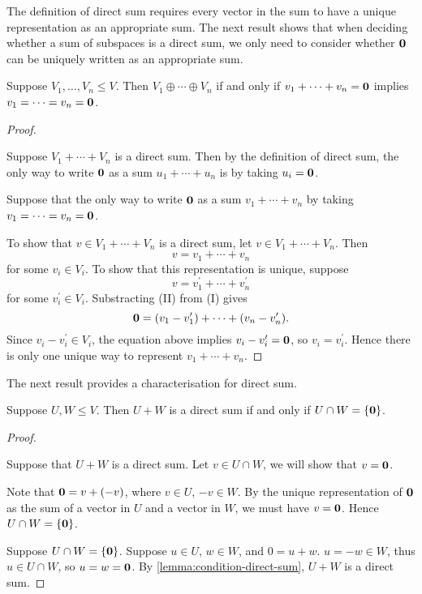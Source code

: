 The definition of direct sum requires
every vector in the sum to have a unique representation as an appropriate sum.
The next result shows that when deciding whether a sum of subspaces is a direct sum, we only need to consider whether $\vb{0}$ can be uniquely written as an appropriate sum.

\begin{lemma}\label{lemma:condition-direct-sum}
Suppose $V_1,\dots,V_n\le V$. Then $V_1\oplus\cdots\oplus V_n$ if and only if $v_1+\cdots+v_n=\vb{0}$ implies $v_1=\cdots=v_n=\vb{0}$.
\end{lemma}

\begin{proof} \

 Suppose $V_1+\cdots+V_n$ is a direct sum. Then by the definition of direct sum, the only way to write $\vb{0}$ as a sum $u_1+\cdots+u_n$ is by taking $u_i=\vb{0}$.

 Suppose that the only way to write $\vb{0}$ as a sum $v_1+\cdots+v_n$ by taking $v_1=\cdots=v_n=\vb{0}$. 

To show that $v\in V_1+\cdots+V_n$ is a direct sum, let $v\in V_1+\cdots+V_n$. Then
\begin{equation*}\tag{I}
v=v_1+\cdots+v_n
\end{equation*}
for some $v_i\in V_i$.
To show that this representation is unique, suppose
\begin{equation*}\tag{II}
v=v_1^\prime+\cdots+v_n^\prime
\end{equation*}
for some $v_i^\prime\in V_i$.
Substracting (II) from (I) gives
\[\vb{0}=(v_1-v_1^\prime)+\cdots+(v_n-v_n^\prime).\]
Since $v_i-v_i^\prime\in V_i$, the equation above implies $v_i-v_i^\prime=\vb{0}$, so $v_i=v_i^\prime$. Hence there is only one unique way to represent $v_1+\cdots+v_n$.
\end{proof}

The next result provides a characterisation for direct sum.

\begin{lemma}\label{lemma:direct-sum-intersection-zero}
Suppose $U,W\le V$. Then $U+W$ is a direct sum if and only if $U\cap W=\{\vb{0}\}$.
\end{lemma}

\begin{proof} \

\fbox{$\implies$} Suppose that $U+W$ is a direct sum. Let $v\in U\cap W$, we will show that $v=\vb{0}$.

Note that $\vb{0}=v+(-v)$, where $v\in U$, $-v\in W$. By the unique representation of $\vb{0}$ as the sum of a vector in $U$ and a vector in $W$, we must have $v=\vb{0}$. Hence $U\cap W=\{\vb{0}\}$.

\fbox{$\impliedby$} Suppose $U\cap W=\{\vb{0}\}$. Suppose $u\in U$, $w\in W$, and $0=u+w$. $u=-w\in W$, thus $u\in U\cap W$, so $u=w=\vb{0}$. By \ref{lemma:condition-direct-sum}, $U+W$ is a direct sum.
\end{proof}
\pagebreak

